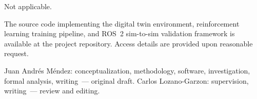 \documentclass[pdflatex,sn-mathphys-num]{sn-jnl}%
\theoremstyle{thmstyleone}%
\theoremstyle{thmstyletwo}%
\theoremstyle{thmstylethree}%
\begin{document}
Not applicable.


The source code implementing the digital twin environment, reinforcement learning training pipeline, and ROS~2 sim-to-sim validation framework is available at the project repository.
Access details are provided upon reasonable request.


Juan Andr\'es M\'endez: conceptualization, methodology, software, investigation, formal analysis, writing~--- original draft.
Carlos Lozano-Garzon: supervision, writing~--- review and editing.


\end{document}

